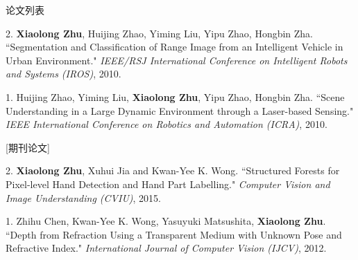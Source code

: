 \documentclass[UTF8]{cv_professional-cn} %
\makeatletter
\newlength{\bibhang}
\newlength{\bibsep}
 {\@listi \global\bibsep\itemsep \global\advance\bibsep by\parsep}
\newenvironment{bibsection}%
        {\vspace{\itemsep}\begin{list}{}{%
       \setlength{\leftmargin}{\bibhang}%
       \setlength{\itemsep}{\bibsep}%
       \setlength{\parsep}{\z@}%
        \setlength{\partopsep}{0pt}%
        \setlength{\topsep}{0pt}}}
        {\end{list}\vspace{\itemsep}}
\makeatother
\begin{document}
\begin{rSection}{论文列表}
\begin{bibsection}
  \item[2.] \textbf{Xiaolong Zhu}, Huijing Zhao, Yiming Liu, Yipu Zhao, Hongbin Zha. ``Segmentation and Classification of Range Image from an Intelligent Vehicle in Urban Environment." \emph{IEEE/RSJ International Conference on Intelligent Robots and Systems (IROS)}, 2010.

  \item[1.] Huijing Zhao, Yiming Liu,\textbf{ Xiaolong Zhu}, Yipu Zhao, Hongbin Zha. ``Scene Understanding in a Large Dynamic Environment through a Laser-based Sensing." \emph{IEEE International Conference on Robotics and Automation (ICRA)}, 2010.
\end{bibsection}

[期刊论文]

\begin{bibsection}
  \item[2.] \textbf{Xiaolong Zhu}, Xuhui Jia and Kwan-Yee K. Wong. ``Structured Forests for Pixel-level Hand Detection and Hand Part Labelling." \emph{Computer Vision and Image Understanding (CVIU)}, 2015.

  \item[1.] Zhihu Chen, Kwan-Yee K. Wong, Yasuyuki Matsushita, \textbf{Xiaolong Zhu}. ``Depth from Refraction Using a Transparent Medium with Unknown Pose and Refractive Index." \emph{International Journal of Computer Vision (IJCV)}, 2012.

\end{bibsection}

\end{rSection}


\end{document}
